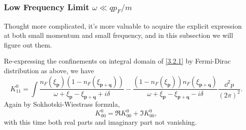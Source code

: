 \documentclass[bachelor,english,numbers]{ustcthesis}
\begin{document}
	\subsubsection{Low Frequency Limit $\omega\ll qp_F/m$}
		Thought more complicated, it's more valuable to acquire the explicit expression at both small momentum and small frequency, and in this subsection we will figure out them.\par
		Re-expressing the confinements on integral domain of \eqref{3.2.1} by Fermi-Dirac distribution as above, we have
		\begin{equation}\label{3.2.4}
			K^0_{11}=\int\dfrac{n_F(\xi_{\bm{p}})(1-n_F(\xi_{\bm{p+q}}))}{\omega+\xi_{\bm{p}}-\xi_{\bm{p+q}}+i\delta}-\dfrac{(1-n_F(\xi_{\bm{p}}))n_F(\xi_{\bm{p+q}})}{\omega+\xi_{\bm{p}}-\xi_{\bm{p+q}}-i\delta}\dfrac{\dd^2 p}{(2\pi)^2}.
		\end{equation}
		Again by Sokhotski-Wiestrass formula, 
		\begin{equation*}
			K^0_{00}=\Re K^0_{00}+\Im K^0_{00},
		\end{equation*}
		with this time both real parts and imaginary part not vanishing.
\end{document}
